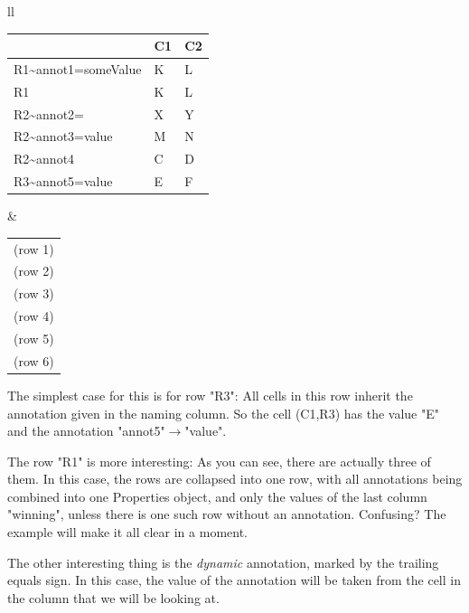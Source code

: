 % 
\begin{tabular}{ll}
	\begin{tabular}{|l|l|l|}
\hline
 & C1 & C2 \\
\hline
R1\textasciitilde annot1=someValue & K & L\\
\hline
R1 & K & L \\
\hline
R2\textasciitilde annot2= & X & Y\\
\hline
R2\textasciitilde annot3=value & M & N\\
\hline
R2\textasciitilde annot4 & C & D\\
\hline
R3\textasciitilde annot5=value & E & F\\
\hline
\end{tabular} 
& 
\begin{tabular}{l}
 \\
 (row 1)\\
 (row 2)\\
 (row 3)\\
 (row 4)\\
 (row 5)\\
 (row 6)\\
\end{tabular}
\end{tabular}


The simplest case for this is for row "R3": All cells in this row inherit the annotation given in the naming column. So the cell (C1,R3) has the value "E" and the annotation "annot5"$\rightarrow $"value".

The row "R1" is more interesting: As you can see, there are actually three of them. In this case, the rows are collapsed into one row, with all annotations being combined into one Properties object, and only the values of the last column "winning", unless there is one such row without an annotation. Confusing? The example will make it all clear in a moment.

The other interesting thing is the \emph{dynamic} annotation, marked by the trailing equals sign. In this case, the value of the annotation will be taken from the cell in the column that we will be looking at.

